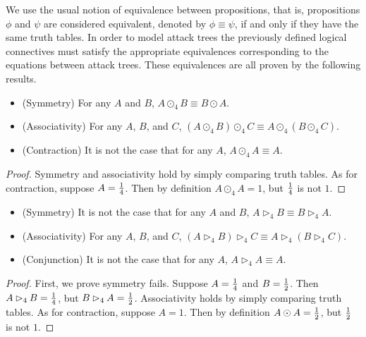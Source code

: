 We use the usual notion of equivalence between propositions, that is,
propositions $\phi$ and $\psi$ are considered equivalent, denoted by
$\phi \equiv \psi$, if and only if they have the same truth tables. In
order to model attack trees the previously defined logical connectives
must satisfy the appropriate equivalences corresponding to the
equations between attack trees.  These equivalences are all proven by
the following results.
\begin{lemma}
  \label{lemma:parallel_conjunction_is_props}
  \begin{itemize}
  \item[] (Symmetry) For any $A$ and $B$, $A \odot_4 B \equiv B \odot A$.\\
  \item[] (Associativity) For any $A$, $B$, and $C$, $(A \odot_4 B) \odot_4 C \equiv A \odot_4 (B \odot_4 C)$.\\
  \item[] (Contraction) It is not the case that for any $A$, $A \odot_4 A \equiv A$.
  \end{itemize}
\end{lemma}
\begin{proof}
  Symmetry and associativity hold by simply comparing truth tables.
  As for contraction, suppose $A = \frac{1}{4}$.  Then by definition $A
  \odot_4 A = 1$, but $\frac{1}{4}$ is not $1$.
\end{proof}

\begin{lemma}
  \label{lemma:sequential_conjunction_props}
  \begin{itemize}
  \item[] (Symmetry) It is not the case that for any $A$ and $B$, $A \rhd_4 B \equiv B \rhd_4 A$.\\
  \item[] (Associativity) For any $A$, $B$, and $C$, $(A \rhd_4 B) \rhd_4 C \equiv A \rhd_4 (B \rhd_4 C)$.\\
  \item[] (Conjunction) It is not the case that for any $A$, $A \rhd_4 A \equiv A$.
  \end{itemize}
\end{lemma}
\begin{proof}
  First, we prove symmetry fails.  Suppose $A = \frac{1}{4}$ and $B =
  \frac{1}{2}$.  Then $A \rhd_4 B = \frac{1}{4}$, but $B \rhd_4 A = \frac{1}{2}$.
  Associativity holds by simply comparing truth tables.  As for
  contraction, suppose $A = 1$.  Then by definition $A \odot A =
  \frac{1}{2}$, but $\frac{1}{2}$ is not $1$.
\end{proof}

